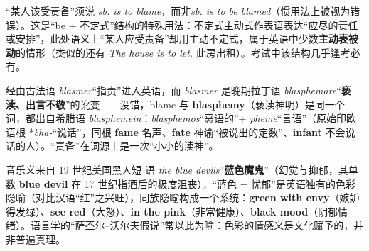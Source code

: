 \documentclass[../main.tex]{subfiles}
\begin{document}



\begin{gram}
“某人该受责备”须说 \textit{sb. is to blame}，而非\textit{sb. is to be blamed}（惯用法上被视为错误）。这是“be + 不定式”结构的特殊用法：不定式主动式作表语表达“应尽的责任或安排”，此处语义上“某人应受责备”却用主动不定式，属于英语中少数\textbf{主动表被动}的情形（类似的还有 \textit{The house is to let.} 此房出租）。考试中该结构几乎逢考必有。
\end{gram}

\begin{origin}
经由古法语 \textit{blasmer}“指责”进入英语，而 \textit{blasmer} 是晚期拉丁语 \textit{blasphemare}“\textbf{亵渎、出言不敬}”的讹变——没错，blame 与 \textbf{blasphemy}（亵渎神明）是同一个词，都出自希腊语 \textit{blasphēmein}：\textit{blasphēmos}“恶语的”+ \textit{phēmē}“言语”（原始印欧语根 *\textit{bhā-}“说话”，同根 \textbf{fame} 名声、\textbf{fate} 神谕“被说出的定数”、\textbf{infant} 不会说话的人）。“责备”在词源上是一次“小小的渎神”。
\end{origin}



\begin{origin}
音乐义来自 19 世纪美国黑人短 语 \textit{the blue devils}“\textbf{蓝色魔鬼}”（幻觉与抑郁，其单数 \textbf{blue devil} 在 17 世纪指酒后的极度沮丧）。“蓝色 = 忧郁”是英语独有的色彩隐喻（对比汉语“红”之兴旺），同族隐喻构成一个系统：\textbf{green with envy}（嫉妒得发绿）、\textbf{see red}（大怒）、\textbf{in the pink}（非常健康）、\textbf{black mood}（阴郁情绪）。语言学的“萨丕尔–沃尔夫假说”常以此为喻：色彩的情感义是文化赋予的，并非普遍真理。
\end{origin}
\end{document}
